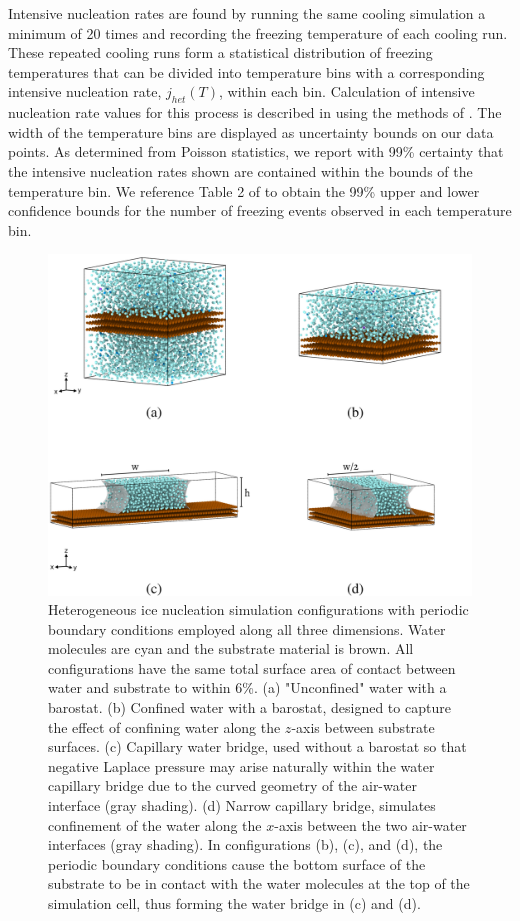 \documentclass[journal abbreviation, manuscript]{copernicus}
\begin{document}
Intensive nucleation rates are found by running the same cooling simulation a minimum of 20 times and recording the freezing temperature of each cooling run. These repeated cooling runs form a statistical distribution of freezing temperatures that can be divided into temperature bins with a corresponding intensive nucleation rate, $j_{het}(T)$, within each bin. Calculation of intensive nucleation rate values for this process is described in \citet{rosky2022} using the methods of \citet{zobrist2007}. The width of the temperature bins are displayed as uncertainty bounds on our data points. As determined from Poisson statistics, we report with 99\% certainty that the intensive nucleation rates shown are contained within the bounds of the temperature bin. We reference Table 2 of \citet{koop1997} to obtain the 99\% upper and lower confidence bounds for the number of freezing events observed in each temperature bin.

\begin{figure}[t]
\includegraphics[width=12cm]{figures/configurations.png}
\caption{\label{fig:configurations} Heterogeneous ice nucleation simulation configurations with periodic boundary conditions employed along all three dimensions. Water molecules are cyan and the substrate material is brown. All configurations have the same total surface area of contact between water and substrate to within 6\%. (a) "Unconfined" water with a barostat. (b) Confined water with a barostat, designed to capture the effect of confining water along the $z$-axis between substrate surfaces. (c) Capillary water bridge, used without a barostat so that negative Laplace pressure may arise naturally within the water capillary bridge due to the curved geometry of the air-water interface (gray shading). (d) Narrow capillary bridge, simulates confinement of the water along the $x$-axis between the two air-water interfaces (gray shading). In configurations (b), (c), and (d), the periodic boundary conditions cause the bottom surface of the substrate to be in contact with the water molecules at the top of the simulation cell, thus forming the water bridge in (c) and (d).}
\end{figure}
\end{document}
